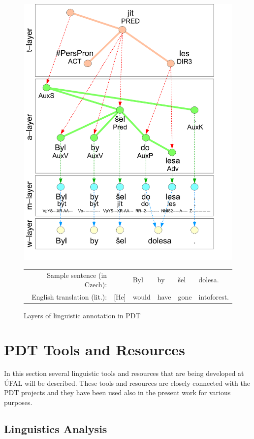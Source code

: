 \begin{figure}
	\begin{center}
	\includegraphics[width=0.6\hsize]{PDT_layers}
		\begin{tabular}{rlllll}
Sample sentence (in Czech): & & Byl & by & šel & dolesa.\\
English translation (lit.):& [He] & would & have & gone & intoforest.			
		\end{tabular}
	\end{center}
\caption{Layers of linguistic annotation in PDT}
\label{fig:ch30_layers}
\end{figure}





\section{PDT Tools and Resources} \label{sec:ch30_pdt_tools_and_resources}

In this section several linguistic tools and resources that are being developed at ÚFAL will be described. These tools and resources are closely connected with the PDT projects and they have been used also in the present work for various purposes.


\subsection{Linguistics Analysis} \label{sec:ch30_ling_tools}

